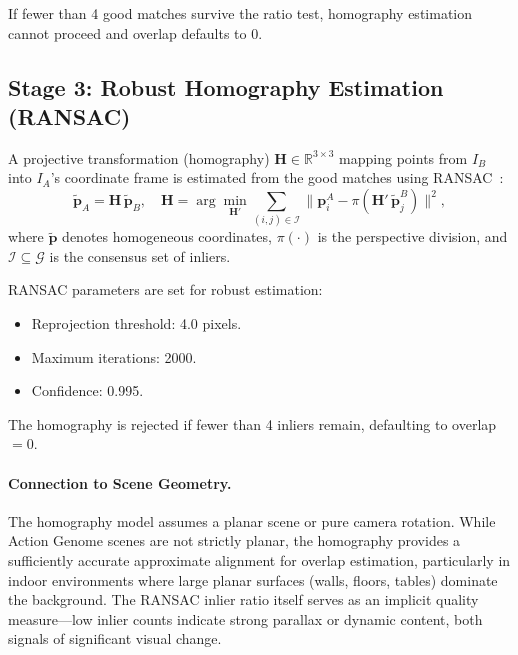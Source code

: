 \documentclass[runningheads]{llncs}
\newcommand{\mR}{\mathbb{R}}
\newcommand{\mat}[1]{\bm{#1}}
\begin{document}
If fewer than 4 good matches survive the ratio test, homography estimation cannot proceed and overlap defaults to 0.

\subsection{Stage 3: Robust Homography Estimation (RANSAC)}
\label{sec:ransac}

A projective transformation (homography) $\mat{H} \in \mR^{3 \times 3}$ mapping points from $I_B$ into $I_A$'s coordinate frame is estimated from the good matches using RANSAC~\cite{fischler1981random}:
\begin{equation}
    \tilde{\mat{p}}_A = \mat{H}\,\tilde{\mat{p}}_B, \quad \mat{H} = \arg\min_{\mat{H}'} \sum_{(i,j) \in \mathcal{I}} \|\mat{p}_{i}^A - \pi(\mat{H}'\,\tilde{\mat{p}}_j^B)\|^2,
    \label{eq:homography}
\end{equation}
where $\tilde{\mat{p}}$ denotes homogeneous coordinates, $\pi(\cdot)$ is the perspective division, and $\mathcal{I} \subseteq \mathcal{G}$ is the consensus set of inliers.

RANSAC parameters are set for robust estimation:
\begin{itemize}
    \item Reprojection threshold: 4.0 pixels.
    \item Maximum iterations: 2000.
    \item Confidence: 0.995.
\end{itemize}
The homography is rejected if fewer than 4 inliers remain, defaulting to overlap~$=0$.

\paragraph{Connection to Scene Geometry.}  The homography model assumes a planar scene or pure camera rotation.  While Action Genome scenes are not strictly planar, the homography provides a sufficiently accurate approximate alignment for overlap estimation, particularly in indoor environments where large planar surfaces (walls, floors, tables) dominate the background.  The RANSAC inlier ratio itself serves as an implicit quality measure---low inlier counts indicate strong parallax or dynamic content, both signals of significant visual change.

\end{document}
